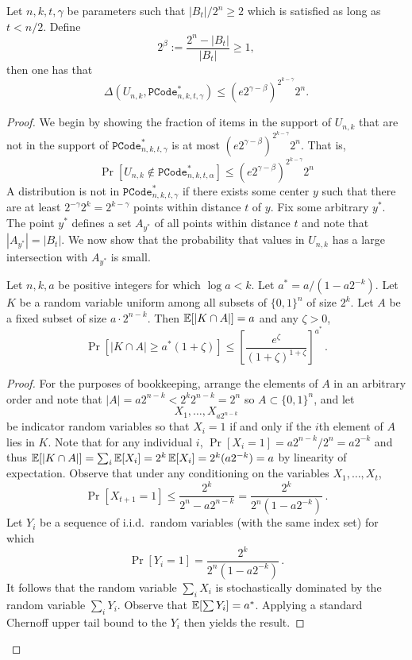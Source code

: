 \begin{lemma}
 \label{lem:close family}
Let $n, k, t, \gamma$ be parameters such that $|B_t|/2^n\ge 2$ which is satisfied as long as $t< n/2 $. Define \[2^\beta:=\frac{2^n-|B_t|}{|B_t|}\ge 1,\] then one has that 
\[\Delta(U_{n,k}, \mathtt{PCode}_{n, k, t, \gamma}^{*}) \le \left(e2^{\gamma-\beta}\right)^{2^{k-\gamma}}2^n.\]
\end{lemma}
\begin{proof}
We begin by showing the fraction of items in the support of $U_{n,k}$ that are not in the support of $\mathtt{PCode}_{n, k, t, \gamma}^{*}$ is at most $\left(e2^{\gamma-\beta}\right)^{2^{k-\gamma}}2^n$.  That is, 
\[\Pr\left[U_{n,k} \not \in \mathtt{PCode}_{n, k, t, \alpha}^{*}\right] \le \left(e2^{\gamma-\beta}\right)^{2^{k-\gamma}}2^n
\]
A distribution is not in $\mathtt{PCode}_{n, k, t, \gamma}^{*}$ if there exists some center $y$ such that there are at least $2^{-\gamma}2^k = 2^{k-\gamma}$ points within distance $t$ of $y$.  Fix some arbitrary $y^*$. The point $y^*$ defines a set $A_{y^*}$ of all points within distance $t$ and note that $|A_{y^*}| = |B_t|$.  We now show that the probability that values in $U_{n,k}$ has a large intersection with $A_{y^*}$ is small.  

  \begin{lemma}
  \label{lem:chernoff independence}
  Let $n,k,a$ be positive integers for which $\log a < k$.  Let $a^* = a/(1 - a2^{-k})$. Let $K$
  be a random variable uniform among all subsets of $\{0,1\}^n$ of
  size $2^k$. Let $A$ be a fixed subset of size $a \cdot 2^{n-k}$. Then
  $\operatorname*{\mathbb{E}}[|K \cap A|] = a$ and any $\zeta > 0$,
  \[
    \Pr[|K \cap A| \geq a^*(1 + \zeta)] \leq \left[\frac{e^\zeta}{(1+\zeta)^{1+\zeta}}\right]^{a^*}\,.
  \]
\end{lemma}
\begin{proof}
  For the purposes of bookkeeping, arrange the elements of $A$ in an
  arbitrary order and note that $|A| = a2^{n-k} < 2^k2^{n-k} = 2^n$ so $A\subset \{0,1\}^n$, and let
  \[
    X_1, \ldots, X_{a2^{n-k}}
  \]
  be indicator random variables so that $X_i = 1$ if and only if the
  $i$th element of $A$ lies in $K$.  Note that for any individual $i$, $\Pr[X_i =1] =a2^{n-k}/2^n = a2^{-k}$ and thus $\operatorname*{\mathbb{E}}[|K\cap A|] =\sum_i \operatorname*{\mathbb{E}}[X_i] = 2^k \operatorname*{\mathbb{E}}[X_i] =2^k (a2^{-k})= a$ by linearity of expectation.  Observe that under any conditioning on the
  variables $X_1, \ldots, X_t$,
  \[
    \Pr[X_{t+1} = 1] \leq \frac{2^k}{2^n - a2^{n-k}} = \frac{2^k}{2^n(1 - a2^{-k})}\,.
  \]
   Let $Y_i$ be a sequence of
  i.i.d.\ random variables (with the same index set) for which
  \[
    \Pr[Y_i = 1] = \frac{2^{k}}{2^n(1 - a2^{-k})}\,.
  \]It follows that the random variable $\sum_i X_i$ is stochastically
  dominated by the random variable $\sum_i Y_i$. Observe that
  $\operatorname*{\mathbb{E}}[\sum Y_i] = a^*$. Applying a standard Chernoff upper tail
  bound to the $Y_i$ then yields the result.
\end{proof}


\end{proof}
